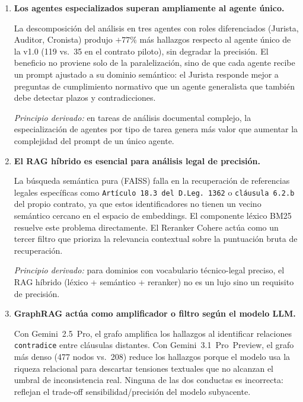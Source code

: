 \begin{enumerate}

    \item \textbf{Los agentes especializados superan ampliamente al agente único.}

    La descomposición del análisis en tres agentes con roles diferenciados
    (Jurista, Auditor, Cronista) produjo $+77\%$ más hallazgos respecto al
    agente único de la v1.0 (119 vs.\ 35 en el contrato piloto), sin
    degradar la precisión. El beneficio no proviene solo de la paralelización,
    sino de que cada agente recibe un prompt ajustado a su dominio semántico:
    el Jurista responde mejor a preguntas de cumplimiento normativo que un
    agente generalista que también debe detectar plazos y contradicciones.

    \textit{Principio derivado:} en tareas de análisis documental complejo,
    la especialización de agentes por tipo de tarea genera más valor que
    aumentar la complejidad del prompt de un único agente.

    \item \textbf{El RAG híbrido es esencial para análisis legal de precisión.}

    La búsqueda semántica pura (FAISS) falla en la recuperación de referencias
    legales específicas como \texttt{Artículo 18.3 del D.Leg.\ 1362} o
    \texttt{cláusula 6.2.b} del propio contrato, ya que estos identificadores
    no tienen un vecino semántico cercano en el espacio de embeddings.
    El componente léxico BM25 resuelve este problema directamente.
    El Reranker Cohere actúa como un tercer filtro que prioriza la relevancia
    contextual sobre la puntuación bruta de recuperación.

    \textit{Principio derivado:} para dominios con vocabulario técnico-legal
    preciso, el RAG híbrido (léxico + semántico + reranker) no es un lujo
    sino un requisito de precisión.

    \item \textbf{GraphRAG actúa como amplificador o filtro según el modelo LLM.}

    Con Gemini~2.5~Pro, el grafo amplifica los hallazgos al identificar
    relaciones \texttt{contradice} entre cláusulas distantes. Con
    Gemini~3.1~Pro~Preview, el grafo más denso (477 nodos vs.\ 208) reduce
    los hallazgos porque el modelo usa la riqueza relacional para descartar
    tensiones textuales que no alcanzan el umbral de inconsistencia real.
    Ninguna de las dos conductas es incorrecta: reflejan el trade-off
    sensibilidad/precisión del modelo subyacente.


\end{enumerate}
